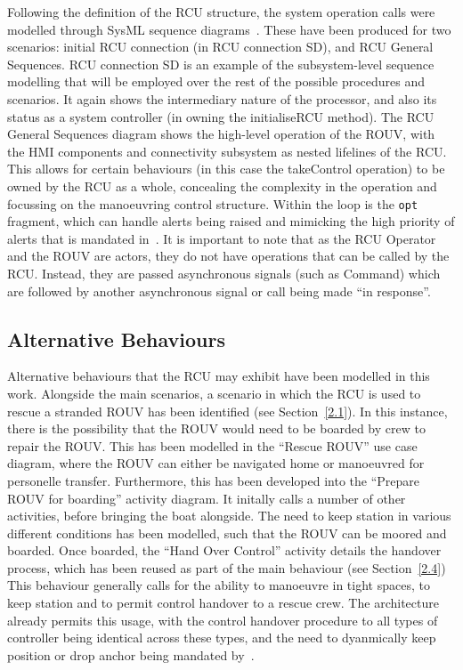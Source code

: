 \documentclass[../main.tex]{subfiles}
\begin{document}
Following the definition of the RCU structure, the system operation calls were modelled through SysML sequence diagrams~\cite{ObjectManagementGroup2017}.
These have been produced for two scenarios: initial RCU connection (in RCU connection SD), and RCU General Sequences.
RCU connection SD is an example of the subsystem-level sequence modelling that will be employed over the rest of the possible procedures and scenarios.
It again shows the intermediary nature of the processor, and also its status as a system controller (in owning the initialiseRCU method).
The RCU General Sequences diagram shows the high-level operation of the ROUV, with the HMI components and connectivity subsystem as nested lifelines of the RCU\@.
This allows for certain behaviours (in this case the takeControl operation) to be owned by the RCU as a whole, concealing the complexity in the operation and focussing on the manoeuvring control structure.
Within the loop is the \texttt{opt} fragment, which can handle alerts being raised and mimicking the high priority of alerts that is mandated in~\cite{WBC3}.
It is important to note that as the RCU Operator and the ROUV are actors, they do not have operations that can be called by the RCU\@.
Instead, they are passed asynchronous signals (such as Command) which are followed by another asynchronous signal or call being made ``in response''.

\subsection{Alternative Behaviours}

Alternative behaviours that the RCU may exhibit have been modelled in this work.
Alongside the main scenarios, a scenario in which the RCU is used to rescue a stranded ROUV has been identified (see Section~\ref{2.1}).
In this instance, there is the possibility that the ROUV would need to be boarded by crew to repair the ROUV\@.
This has been modelled in the ``Rescue ROUV'' use case diagram, where the ROUV can either be navigated home or manoeuvred for personelle transfer.
Furthermore, this has been developed into the ``Prepare ROUV for boarding'' activity diagram.
It initally calls a number of other activities, before bringing the boat alongside.
The need to keep station in various different conditions has been modelled, such that the ROUV can be moored and boarded.
Once boarded, the ``Hand Over Control'' activity details the handover process, which has been reused as part of the main behaviour (see Section~\ref{2.4})
This behaviour generally calls for the ability to manoeuvre in tight spaces, to keep station and to permit control handover to a rescue crew.
The architecture already permits this usage, with the control handover procedure to all types of controller being identical across these types, and the need to dyanmically keep position or drop anchor being mandated by~\cite{WBC3}.
\end{document}
